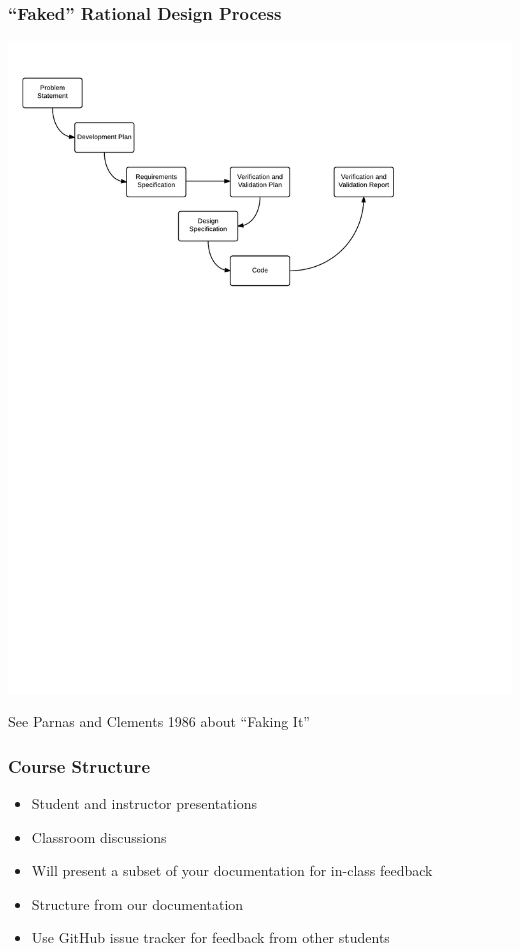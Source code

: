 \documentclass[t,12pt,numbers,fleqn]{beamer}
\begin{document}
\begin{frame}

\frametitle{``Faked'' Rational Design Process}

\begin{center}
\includegraphics[scale=0.6]{../Figures/OverviewOfProcess.pdf}
\end{center}

See Parnas and Clements 1986 about ``Faking It''

\end{frame}


\begin{frame}
\frametitle{Course Structure}

\begin {itemize}

\item Student and instructor presentations
\item Classroom discussions
\item Will present a subset of your documentation for in-class feedback
\item Structure from our documentation
\item Use GitHub issue tracker for feedback from other students

\end {itemize}

\end{frame}
\end{document}
